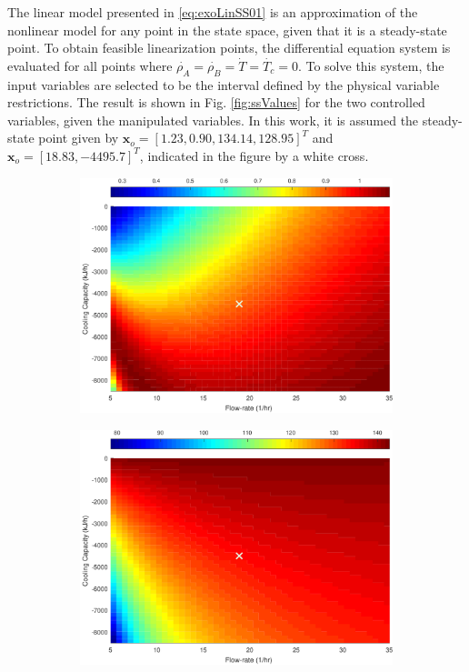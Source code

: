 \documentclass[a4paper,11pt]{book}
\numberwithin{figure}{chapter}
\numberwithin{equation}{chapter}
\numberwithin{table}{chapter}
\theoremstyle{definition}
\begin{document}
The linear model presented in \eqref{eq:exoLinSS01} is an approximation of the nonlinear model for any point in the state space, given that it is a steady-state point. To obtain feasible linearization points, the differential equation system is evaluated for all points where $\dot{\rho_A} = \dot{\rho_B} =\dot{T} =\dot{T_c} = 0$. To solve this system, the input variables are selected to be the interval defined by the physical variable restrictions. The result is shown in Fig. \ref{fig:ssValues} for the two controlled variables, given the manipulated variables. In this work, it is assumed the steady-state point given by $\bm{x}_o = [1.23, 0.90, 134.14, 128.95]^T$ and $\bm{x}_o = [18.83, -4495.7]^T$, indicated in the figure by a white cross.

\begin{figure}[ht] \centering
	\begin{subfigure}{0.46\textwidth}
		\includegraphics[width=\textwidth]{chapter7/ssValues01}
	\end{subfigure} \hfill
	\begin{subfigure}{0.46\textwidth}
		\includegraphics[width=\textwidth]{chapter7/ssValues02}
	\end{subfigure}
	

\end{figure}
\end{document}
